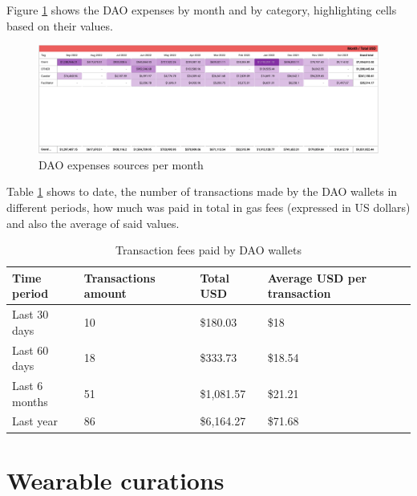 \documentclass[MSE,Master,english]{twbook}%
\begin{document}
Figure \ref{fig:expenses} shows the DAO expenses by month and by category, highlighting cells based on their values.
\begin{figure}[H]
  \centering
  \includegraphics[width=\textwidth]{metrics/expenses.png}
  \caption{DAO expenses sources per month}
  \label{fig:expenses}
\end{figure}

Table \ref{table:fees} shows to date, the number of transactions made by the DAO wallets in different periods, how much was paid in total in gas fees (expressed in US dollars) and also the average of said values.
\begin{center}
  \begin{table}[H]
    \begin{tabular}{ | m{8em} | m{10em} | m{6em} | m{15em} | }
      \hline
      \textbf{Time period} & \textbf{Transactions amount} & \textbf{Total USD} & \textbf{Average USD per transaction} \\ 
      \hline
      Last 30 days &	10 &	\$180.03 &	\$18 \\
      \hline
      Last 60 days &	18 &	\$333.73 &	\$18.54 \\
      \hline
      Last 6 months &	51 &	\$1,081.57 &	\$21.21 \\
      \hline
      Last year &	86 &	\$6,164.27 &	\$71.68 \\
      \hline
    \end{tabular}
    \caption{Transaction fees paid by DAO wallets}
    \label{table:fees}
  \end{table}
\end{center}

\section{Wearable curations}
\end{document}
